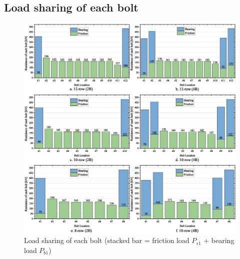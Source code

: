 \subsection{Load sharing of each bolt}
\label{LS}

\begin{figure}
    \includegraphics[width=\linewidth]{imgs/ch7/LS-all.eps}
    \caption{Load sharing of each bolt (stacked bar = friction load $P_{s1}$ + bearing load $P_{b1}$)}
    \label{fig-ls-all}
\end{figure}

